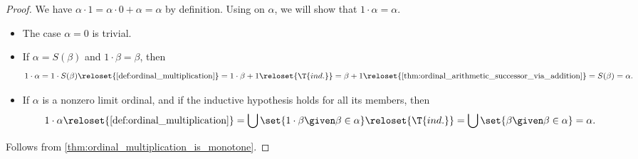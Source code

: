 \begin{proof}
   We have \( \alpha \cdot 1 = \alpha \cdot 0 + \alpha = \alpha \) by definition. Using  on \( \alpha \), we will show that \( 1 \cdot \alpha = \alpha \).
  \begin{itemize}
    \item The case \( \alpha = 0 \) is trivial.
    \item If \( \alpha = S(\beta) \) and \( 1 \cdot \beta = \beta \), then
    \begin{equation*}
      1 \cdot \alpha
      =
      1 \cdot S(\beta)
      \reloset {\ref{def:ordinal_multiplication}} =
      1 \cdot \beta + 1
      \reloset {\T{ind.}} =
      \beta + 1
      \reloset {\ref{thm:ordinal_arithmetic_successor_via_addition}} =
      S(\beta)
      =
      \alpha.
    \end{equation*}

    \item If \( \alpha \) is a nonzero limit ordinal, and if the inductive hypothesis holds for all its members, then
    \begin{equation*}
      1 \cdot \alpha
      \reloset {\ref{def:ordinal_multiplication}} =
      \bigcup\set{ 1 \cdot \beta \given \beta \in \alpha }
      \reloset {\T{ind.}} =
      \bigcup\set{ \beta \given \beta \in \alpha }
      =
      \alpha.
    \end{equation*}
  \end{itemize}

   Follows from \cref{thm:ordinal_multiplication_is_monotone}.
\end{proof}

